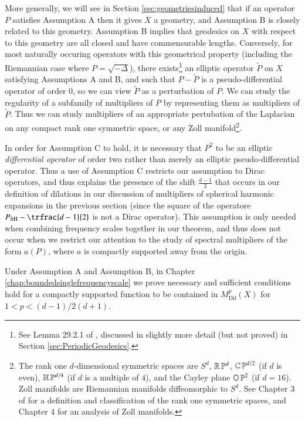 More generally, we will see in Section \ref{sec:geometriesinduced} that if an operator $P$ satisfies Assumption A then it gives $X$ a geometry, and Assumption B is closely related to this geometry. Assumption B implies that geodesics on $X$ with respect to this geometry are all closed and have commensurable lengths. Conversely, for most naturally occuring operators with this geometrical property (including the Riemannian case where $P = \sqrt{-\Delta}$), there exists\footnote{See Lemma 29.2.1 of \cite{Hormander4}, discussed in slightly more detail (but not proved) in Section \ref{sec:PeriodicGeodesics}.} an elliptic operator $\tilde{P}$ on $X$ satisfying Assumptions A and B, and such that $P - \tilde{P}$ is a pseudo-differential operator of order $0$, so we can view $\tilde{P}$ as a perturbation of $P$. We can study the regularity of a subfamily of multipliers of $P$ by representing them as multipliers of $\tilde{P}$. Thus we can study multipliers of an appropriate pertubation of the Laplacian on any compact rank one symmetric space, or any Zoll manifold\footnote{The rank one $d$-dimensional symmetric spaces are $S^d$, $\operatorname{\mathbb{R}} \operatorname{\mathbb{P}}^d$, $\operatorname{\mathbb{C}} \operatorname{\mathbb{P}}^{d/2}$ (if $d$ is even), $\mathbb{H} \operatorname{\mathbb{P}}^{d/4}$ (if $d$ is a multiple of $4$), and the Cayley plane $\mathbb{O} \operatorname{\mathbb{P}}^2$ (if $d = 16$). Zoll manifolds are Riemannian manifolds diffeomorphic to $S^d$. See Chapter 3 of \cite{Besse} for a definition and classification of the rank one symmetric spaces, and Chapter 4 for an analysis of Zoll manifolds.}.

In order for Assumption C to hold, it is necessary that $P^2$ to be an elliptic \emph{differential operator} of order two rather than merely an elliptic pseudo-differential operator. Thus a use of Assumption C restricts our assumption to Dirac operators, and thus explains the presence of the shift $\tfrac{d-1}{2}$ that occurs in our definition of dilations in our discussion of multipliers of spherical harmonic expansions in the previous section (since the square of the operatore $P_{\text{SH}} - \trfrac{d-1}{2}$ is not a Dirac operator). This assumption is only needed when combining frequency scales together in our theorem, and thus does not occur when we restrict our attention to the study of spectral multipliers of the form $a(P)$, where $a$ is compactly supported away from the origin.

Under Assumption A and Assumption B, in Chapter \ref{chap:boundedsinglefrequencyscale} we prove necessary and sufficient conditions hold for a compactly supported function to be contained in $M^p_{\text{Dil}}(X)$ for $1 < p < (d-1)/2(d+1)$.

